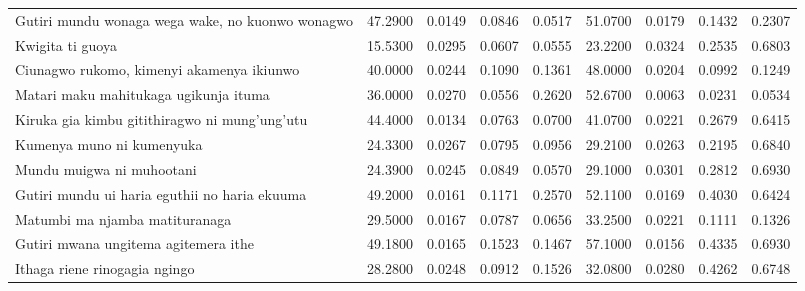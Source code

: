 \begin{table}
\begin{tabular}{lrrrrrrrr}
        Gutiri mundu wonaga wega wake, no kuonwo wonagwo & 47.2900                                 & 0.0149                                  & 0.0846 & 0.0517 & 51.0700   & 0.0179   & 0.1432 & 0.2307 \\
        Kwigita ti guoya                                 & 15.5300                                 & 0.0295                                  & 0.0607 & 0.0555 & 23.2200   & 0.0324   & 0.2535 & 0.6803 \\
        Ciunagwo rukomo, kimenyi akamenya ikiunwo        & 40.0000                                 & 0.0244                                  & 0.1090 & 0.1361 & 48.0000   & 0.0204   & 0.0992 & 0.1249 \\
        Matari maku mahitukaga ugikunja ituma            & 36.0000                                 & 0.0270                                  & 0.0556 & 0.2620 & 52.6700   & 0.0063   & 0.0231 & 0.0534 \\
        Kiruka gia kimbu gitithiragwo ni mung’ung’utu    & 44.4000                                 & 0.0134                                  & 0.0763 & 0.0700 & 41.0700   & 0.0221   & 0.2679 & 0.6415 \\
        Kumenya muno ni kumenyuka                        & 24.3300                                 & 0.0267                                  & 0.0795 & 0.0956 & 29.2100   & 0.0263   & 0.2195 & 0.6840 \\
        Mundu muigwa ni muhootani                        & 24.3900                                 & 0.0245                                  & 0.0849 & 0.0570 & 29.1000   & 0.0301   & 0.2812 & 0.6930 \\
        Gutiri mundu ui haria eguthii no haria ekuuma    & 49.2000                                 & 0.0161                                  & 0.1171 & 0.2570 & 52.1100   & 0.0169   & 0.4030 & 0.6424 \\
        Matumbi ma njamba matituranaga                   & 29.5000                                 & 0.0167                                  & 0.0787 & 0.0656 & 33.2500   & 0.0221   & 0.1111 & 0.1326 \\
        Gutiri mwana ungitema agitemera ithe             & 49.1800                                 & 0.0165                                  & 0.1523 & 0.1467 & 57.1000   & 0.0156   & 0.4335 & 0.6930 \\
        Ithaga riene rinogagia ngingo                    & 28.2800                                 & 0.0248                                  & 0.0912 & 0.1526 & 32.0800   & 0.0280   & 0.4262 & 0.6748 \\

\end{tabular}
\end{table}
